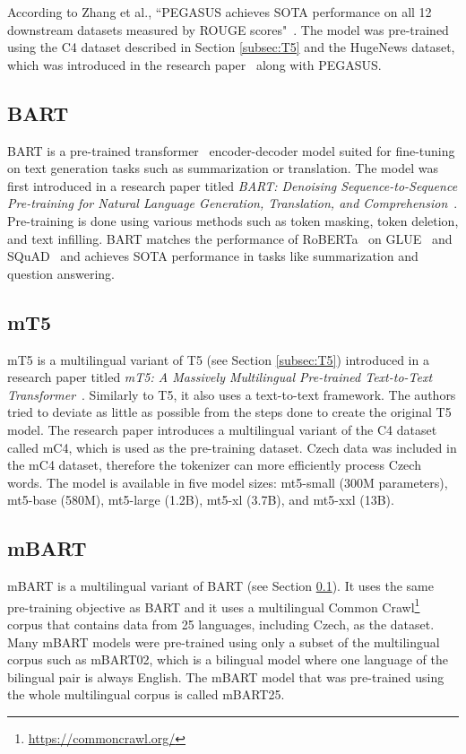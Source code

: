 \documentclass[english, ba, kiv, he, iso690numb, pdf, viewonly]{fasthesis}
\begin{document}
According to Zhang et al., “PEGASUS achieves SOTA performance on all 12 downstream datasets measured by ROUGE scores"~\cite{zhang2019pegasus}. The model was pre-trained using the C4 dataset described in Section \ref{subsec:T5} and the HugeNews dataset, which was introduced in the research paper~\cite{zhang2019pegasus} along with PEGASUS.
\subsection{BART} \label{subsec:BART}
BART is a pre-trained transformer~\cite{vaswani2023attention} encoder-decoder model suited for fine-tuning on text generation tasks such as summarization or translation. The model was first introduced in a research paper titled \textit{BART: Denoising Sequence-to-Sequence Pre-training for Natural Language Generation, Translation, and Comprehension}~\cite{lewis2019bart}. Pre-training is done using various methods such as token masking, token deletion, and text infilling. BART matches the performance of RoBERTa~\cite{liu2019roberta} on GLUE~\cite{wang-etal-2018-glue} and SQuAD~\cite{rajpurkar2016squad} and achieves SOTA performance in tasks like summarization and question answering.

\subsection{mT5}
mT5 is a multilingual variant of T5 (see Section \ref{subsec:T5}) introduced in a research paper titled \textit{mT5: A Massively Multilingual Pre-trained Text-to-Text Transformer}~\cite{xue-etal-2021-mt5}. Similarly to T5, it also uses a text-to-text framework. The authors tried to deviate as little as possible from the steps done to create the original T5 model. The research paper introduces a multilingual variant of the C4 dataset called mC4, which is used as the pre-training dataset. Czech data was included in the mC4 dataset, therefore the tokenizer can more efficiently process Czech words.
The model is available in five model sizes: mt5-small (300M parameters), mt5-base (580M), mt5-large (1.2B), mt5-xl (3.7B), and mt5-xxl (13B).

\subsection{mBART}
mBART is a multilingual variant of BART (see Section \ref{subsec:BART}). It uses the same pre-training objective as BART and it uses a multilingual Common Crawl\footnote{\url{https://commoncrawl.org/}} corpus that contains data from 25 languages, including Czech, as the dataset. Many mBART models were pre-trained using only a subset of the multilingual corpus such as mBART02, which is a bilingual model where one language of the bilingual pair is always English. The mBART model that was pre-trained using the whole multilingual corpus is called mBART25.
\end{document}
